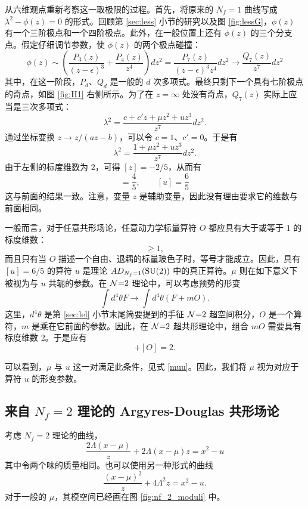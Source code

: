 从六维观点重新考察这一取极限的过程。首先，将原来的 $N_f=1$ 曲线写成 $\lambda^2-\phi(z)=0$ 的形式。回顾第 \ref{sec:less} 小节的研究以及图 \ref{fig:lessG}，$\phi(z)$ 有一个三阶极点和一个四阶极点。此外，在一般位置上还有 $\phi(z)$ 的三个分支点。假定仔细调节参数，使 $\phi(z)$ 的两个极点碰撞：
\begin{equation}
\phi(z)\sim(\frac{P_3(z)}{(z-\epsilon)^3}+\frac{P_4(z)}{z^4})dz^2
=\frac{P_7(z)}{(z-\epsilon)^3z^4}dz^2
\to\frac{Q_7(z)}{z^7}dz^2
\end{equation}
其中，在这一阶段，$P_d$、$Q_d$ 是一般的 $d$ 次多项式。最终只剩下一个具有七阶极点的奇点，如图 \ref{fig:H1} 右侧所示。为了在 $z=\infty$ 处没有奇点，$Q_7(z)$ 实际上应当是三次多项式：
\begin{equation}
\lambda^2=\frac{c+c'z+\mu z^2+uz^3}{z^7}dz^2.
\end{equation}
通过坐标变换 $z\to z/(az-b)$，可以令 $c=1$、$c'=0$。于是有
\begin{equation}
\lambda^2=\frac{1+\mu z^2+uz^3}{z^7}dz^2.
\end{equation}
由于左侧的标度维数为 $2$，可得 $[z]=-2/5$，从而有
\begin{equation}
[\mu]=\frac45,\qquad[u]=\frac65\label{muu}
\end{equation}
这与前面的结果一致。注意，变量 $z$ 是辅助变量，因此没有理由要求它的维数与前面相同。

一般而言，对于任意共形场论，任意动力学标量算符 $O$ 都应具有大于或等于 $1$ 的标度维数：
\begin{equation}
[O]\ge1,\label{generalCFTfeatures}
\end{equation}
而且只有当 $O$ 描述一个自由、退耦的标量玻色子时，等号才能成立。因此，具有 $[u]=6/5$ 的算符 $u$ 是理论 $AD_{N_f=1}(\mathop{\mathrm{SU}}(2))$ 中的真正算符。$\mu$ 则在如下意义下被视为与 $u$ 共轭的参数。在 $\mathcal{N}{=}2$ 理论中，可以考虑预势的形变
\begin{equation}
\int d^4\theta F\to\int d^4\theta(F+mO).
\end{equation}
这里，$d^4\theta$ 是第 \ref{sec:lel} 小节末尾简要提到的手征 $\mathcal{N}{=}2$ 超空间积分，$O$ 是一个算符，$m$ 是乘在它前面的参数。因此，在 $\mathcal{N}{=}2$ 超共形理论中，组合 $mO$ 需要具有标度维数 $2$。于是应有
\begin{equation}
[m]+[O]=2.
\end{equation}

可以看到，$\mu$ 与 $u$ 这一对满足此条件，见式 \eqref{muu}。因此，我们将 $\mu$ 视为对应于算符 $u$ 的形变参数。

\subsection{来自 $N_f=2$ 理论的 Argyres-Douglas 共形场论}
考虑 $N_f=2$ 理论的曲线，
\begin{equation}
\frac{2\Lambda(x-\mu)}z+2\Lambda(x-\mu)z=x^2-u\label{firstform}
\end{equation}
其中令两个味的质量相同。也可以使用另一种形式的曲线
\begin{equation}
\frac{(x-\mu)^2}z+4\Lambda^2z=x^2-u.\label{secondform}
\end{equation}
对于一般的 $\mu$，其模空间已经画在图 \ref{fig:nf_2_moduli} 中。

